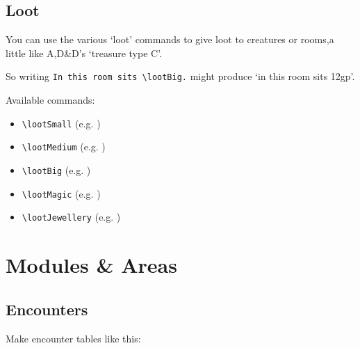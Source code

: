 \documentclass[a4paper,openany]{book}
\begin{document}
\begin{multicols}{2}
\subsection{Loot}

You can use the various `loot' commands to give loot to creatures or rooms,a little like A,D\&D's `treasure type C'.

So writing \verb"In this room sits \lootBig." might produce `in this room sits 12gp'.

Available commands:

\begin{itemize}

  \item
  \verb"\lootSmall" (e.g. \lootSmall)
  \item
  \verb"\lootMedium" (e.g. \lootMedium)
  \item
  \verb"\lootBig" (e.g. \lootBig)
  \item
  \verb"\lootMagic" (e.g. \lootMagic)
  \item
  \verb"\lootJewellery" (e.g. \lootJewellery)

\end{itemize}

\end{multicols}

\section{Modules \& Areas}

\subsection{Encounters}

Make encounter tables like this:
\end{document}
